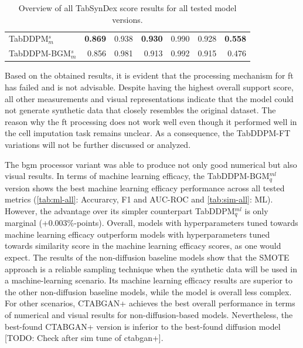 \begin{table}[h]
\begin{tabular}{lrrrrrr}
		TabDDPM$^{s}_m$      & \textbf{0.869}            & 0.938          & \textbf{0.930}       & 0.990          & 0.928            & \textbf{0.558} \\
		TabDDPM-BGM$^{s}_m$  & 0.856                     & 0.981          & 0.913                & 0.992          & 0.915            & 0.476          \\
		\bottomrule
	\end{tabular}
	\caption[Overview all TabSynDex results]{Overview of all TabSynDex score results for all tested model versions.}
	\label{tab:sim-all}
\end{table}

Based on the obtained results, it is evident that the processing mechanism for \gls{ft} has failed and is not advisable. 
Despite having the highest overall support score, all other measurements and visual representations indicate that the model could not generate synthetic data that closely resembles the original dataset.
The reason why the \gls{ft} processing does not work well even though it performed well in the cell imputation task \cite{zheng2022DiffusionModelsMissing} remains unclear.
As a consequence, the TabDDPM-FT variations will not be further discussed or analyzed.

The \gls{bgm} processor variant was able to produce not only good numerical but also visual results.
In terms of machine learning efficacy, the TabDDPM-BGM$^{ml}_q$ version shows the best machine learning efficacy performance across all tested metrics (\autoref{tab:ml-all}: Accurarcy, F1 and AUC-ROC and \autoref{tab:sim-all}: ML).
However, the advantage over its simpler counterpart TabDDPM$^{ml}_q$ is only marginal (+0.003\%-points).
Overall, models with hyperparameters tuned towards machine learning efficacy outperform models with hyperparameters tuned towards similarity score in the machine learning efficacy scores, as one would expect.
The results of the non-diffusion baseline models show that the SMOTE approach is a reliable sampling technique when the synthetic data will be used in a machine-learning scenario.
Its machine learning efficacy results are superior to the other non-diffusion baseline models, while the model is overall less complex.
For other scenarios, CTABGAN+ achieves the best overall performance in terms of numerical and visual results for non-diffusion-based models.
Nevertheless, the best-found CTABGAN+ version is inferior to the best-found diffusion model [TODO: Check after sim tune of ctabgan+].

